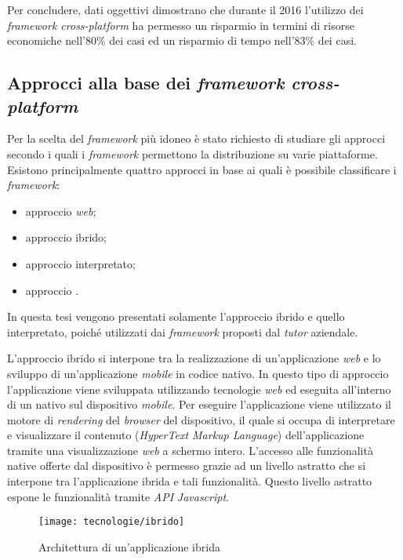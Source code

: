 Per concludere, dati oggettivi dimostrano che durante il 2016 l'utilizzo dei \textit{framework cross-platform} ha permesso un risparmio in termini di risorse economiche nell'80\% dei casi ed un risparmio di tempo nell'83\% dei casi.

\subsection{Approcci alla base dei \textit{framework cross-platform}}

Per la scelta del \textit{framework} più idoneo è stato richiesto di studiare gli approcci secondo i quali i \textit{framework} permettono la distribuzione su varie piattaforme. Esistono principalmente quattro approcci in base ai quali è possibile classificare i \textit{framework}:
\begin{itemize}
	\item approccio \textit{web};
	\item approccio ibrido;
	\item approccio interpretato;
	\item approccio .
\end{itemize}

In questa tesi vengono presentati solamente l'approccio ibrido e quello interpretato, poiché utilizzati dai \textit{framework} proposti dal \textit{tutor} aziendale.

L'approccio ibrido si interpone tra la realizzazione di un'applicazione \textit{web} e lo sviluppo di un'applicazione \textit{mobile} in codice nativo. In questo tipo di approccio l'applicazione viene sviluppata utilizzando tecnologie \textit{web} ed eseguita all'interno di un  nativo sul dispositivo \textit{mobile}. Per eseguire l'applicazione viene utilizzato il motore di \textit{rendering} del \textit{browser} del dispositivo, il quale si occupa di interpretare e visualizzare il contenuto  (\textit{HyperText Markup Language}) dell'applicazione tramite una visualizzazione \textit{web} a schermo intero. L'accesso alle funzionalità native offerte dal dispositivo è permesso grazie ad un livello astratto che si interpone tra l'applicazione ibrida e tali funzionalità. Questo livello astratto espone le funzionalità tramite \textit{API} \textit{Javascript}. 

\begin{figure}[!h] 
    \centering 
    \texttt{[image: tecnologie/ibrido]} 
    \caption{Architettura di un'applicazione ibrida}
\end{figure}


